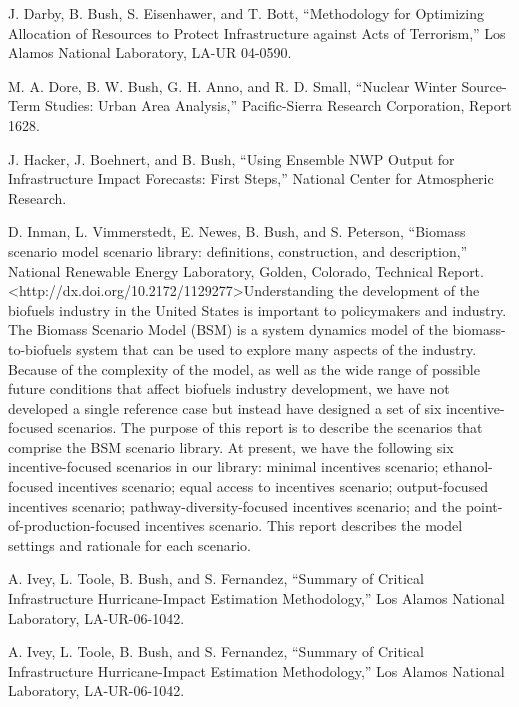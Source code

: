 \documentclass[]{article}
\begin{document}
J. Darby, B. Bush, S. Eisenhawer, and T. Bott, ``Methodology for
Optimizing Allocation of Resources to Protect Infrastructure against
Acts of Terrorism,'' Los Alamos National Laboratory, LA-UR 04-0590.

M. A. Dore, B. W. Bush, G. H. Anno, and R. D. Small, ``Nuclear Winter
Source-Term Studies: Urban Area Analysis,'' Pacific-Sierra Research
Corporation, Report 1628.

J. Hacker, J. Boehnert, and B. Bush, ``Using Ensemble NWP Output for
Infrastructure Impact Forecasts: First Steps,'' National Center for
Atmospheric Research.

D. Inman, L. Vimmerstedt, E. Newes, B. Bush, and S. Peterson, ``Biomass
scenario model scenario library: definitions, construction, and
description,'' National Renewable Energy Laboratory, Golden, Colorado,
Technical Report.
\textless{}http://dx.doi.org/10.2172/1129277\textgreater{}Understanding
the development of the biofuels industry in the United States is
important to policymakers and industry. The Biomass Scenario Model (BSM)
is a system dynamics model of the biomass-to-biofuels system that can be
used to explore many aspects of the industry. Because of the complexity
of the model, as well as the wide range of possible future conditions
that affect biofuels industry development, we have not developed a
single reference case but instead have designed a set of six
incentive-focused scenarios. The purpose of this report is to describe
the scenarios that comprise the BSM scenario library. At present, we
have the following six incentive-focused scenarios in our library:
minimal incentives scenario; ethanol-focused incentives scenario; equal
access to incentives scenario; output-focused incentives scenario;
pathway-diversity-focused incentives scenario; and the
point-of-production-focused incentives scenario. This report describes
the model settings and rationale for each scenario.

A. Ivey, L. Toole, B. Bush, and S. Fernandez, ``Summary of Critical
Infrastructure Hurricane-Impact Estimation Methodology,'' Los Alamos
National Laboratory, LA-UR-06-1042.

A. Ivey, L. Toole, B. Bush, and S. Fernandez, ``Summary of Critical
Infrastructure Hurricane-Impact Estimation Methodology,'' Los Alamos
National Laboratory, LA-UR-06-1042.
\end{document}
